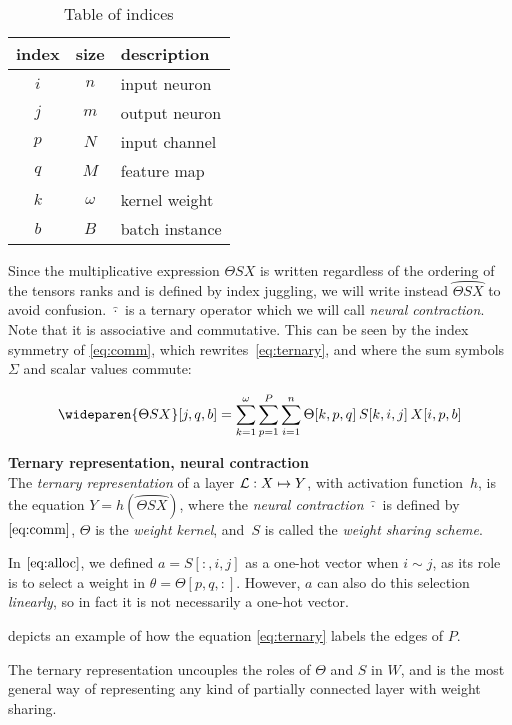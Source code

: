 \begin{table}[H]
  \centering
\begin{tabular}{ccl}
  index & size & description\\
  \hline
  $i$ & $n$ & input neuron\\
  $j$ & $m$ & output neuron\\
  $p$ & $N$ & input channel\\
  $q$ & $M$ & feature map\\
  $k$ & $\omega$ & kernel weight\\
  $b$ & $B$ & batch instance
\end{tabular}
\caption{Table of indices}
\label{tab:ind}
\end{table}

Since the multiplicative expression $\Theta S X$ is written regardless of the ordering of the tensors ranks and is defined by index juggling, we will write instead $\wideparen{\Theta S X}$ to avoid confusion. $\wideparen{\cdot}$ is a ternary operator which we will call \emph{neural contraction}. Note that it is associative and commutative. This can be seen by the index symmetry of \eqref{eq:comm}, which rewrites~\eqref{eq:ternary}, and where the sum symbols~$\Sigma$ and scalar values commute:

\begin{gather}
\wideparen{\Theta SX}[j,q,b] = \displaystyle \sum_{k=1}^\omega \sum_{p=1}^P \sum_{i=1}^n \Theta[k,p,q] \h{2} S[k,i,j] \h{2} X[i,p,b] \label{eq:comm}
\end{gather}

\begin{definition}\textbf{Ternary representation, neural contraction}\\
The \emph{ternary representation} of a layer $\mathcal{L}: X \mapsto Y$, with activation function~$h$, is the equation $Y = h\left(\wideparen{\Theta S X}\right)$, where the \emph{neural contraction} $\wideparen{\cdot}$ is defined by~$\eqref{eq:comm}$, $\Theta$ is the \emph{weight kernel}, and~$S$ is called the \emph{weight sharing scheme}.
\label{def:ter}
\end{definition}

\begin{remark}
In $\eqref{eq:alloc}$, we defined $a = S[:,i,j]$ as a one-hot vector when $i \sim j$, as its role is to select a weight in $\theta = \Theta[p,q,:]$. However, $a$ can also do this selection \emph{linearly}, so in fact it is not necessarily a one-hot vector.
\end{remark}

 depicts an example of how the equation \eqref{eq:ternary} labels the edges of $P$.


The ternary representation uncouples the roles of $\Theta$ and $S$ in $W$, and is the most general way of representing any kind of partially connected layer with weight sharing.
